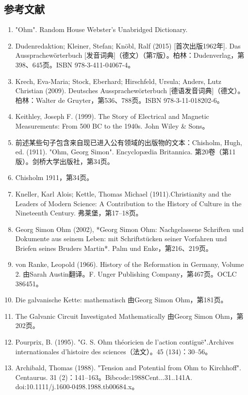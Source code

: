 \subsection{参考文献}  
\begin{enumerate}
\item "Ohm". Random House Webster's Unabridged Dictionary.  
\item Dudenredaktion; Kleiner, Stefan; Knöbl, Ralf (2015) [首次出版1962年]. Das Aussprachewörterbuch [发音词典]（德文）（第7版）。柏林：Dudenverlag，第398、645页。ISBN 978-3-411-04067-4。  
\item Krech, Eva-Maria; Stock, Eberhard; Hirschfeld, Ursula; Anders, Lutz Christian (2009). Deutsches Aussprachewörterbuch [德语发音词典]（德文）。柏林：Walter de Gruyter，第536、788页。ISBN 978-3-11-018202-6。  
\item Keithley, Joseph F. (1999). The Story of Electrical and Magnetic Measurements: From 500 BC to the 1940s. John Wiley & Sons。  
\item 前述某些句子包含来自现已进入公有领域的出版物的文本：Chisholm, Hugh, ed. (1911). "Ohm, Georg Simon". Encyclopædia Britannica. 第20卷（第11版）。剑桥大学出版社，第34页。  
\item Chisholm 1911，第34页。  
\item Kneller, Karl Alois; Kettle, Thomas Michael (1911).Christianity and the Leaders of Modern Science: A Contribution to the History of Culture in the Nineteenth Century. 弗莱堡，第17–18页。  
\item Georg Simon Ohm (2002), *Georg Simon Ohm: Nachgelassene Schriften und Dokumente aus seinem Leben: mit Schriftstücken seiner Vorfahren und Briefen seines Bruders Martin*. Palm und Enke，第216、219页。
\item von Ranke, Leopold (1966). History of the Reformation in Germany, Volume 2. 由Sarah Austin翻译。F. Unger Publishing Company，第467页。OCLC 386451。  
\item Die galvanische Kette: mathematisch 由Georg Simon Ohm，第181页。  
\item The Galvanic Circuit Investigated Mathematically 由Georg Simon Ohm，第202页。  
\item Pourprix, B. (1995). "G. S. Ohm théoricien de l'action contiguë".Archives internationales d'histoire des sciences（法文）。45 (134)：30–56。  
\item Archibald, Thomas (1988). "Tension and Potential from Ohm to Kirchhoff". Centaurus. 31 (2)：141–163。Bibcode:1988Cent...31..141A. doi:10.1111/j.1600-0498.1988.tb00684.x。  

\end{enumerate}
